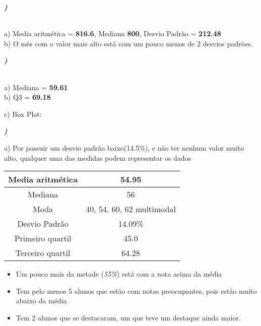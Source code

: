 \documentclass[12pt]{article}
\newcounter{instn}
\newcommand{\instnum}{\arabic{instn}}
\newcommand{\myline}[1]{
    \emph{\textbf{#1)}}
    \addtocounter{instn}{1}
}
\begin{document}
    \myline{\instnum} \\ a) Media aritmética = \textbf{816.6}, Mediana \textbf{800}, Desvio Padrão = \textbf{212.48}
    \\ b) O mês com o valor mais alto está com um pouco menos de 2 desvios padrões.


    \myline{\instnum} \\ a) Mediana = \textbf{59.61} \\ b) Q3 = \textbf{69.18}

    c) Box Plot: 
    \begin{center}
    \end{center}



    \myline{\instnum}

    a) Por possuir um desvio padrão baixo(14.5\%), e não ter nenhum valor muito alto,
    qualquer uma das medidas podem representar os dados

    \begin{center}
        \begin{tabular}{|c | c |} 
        \hline
        Media aritmética & 54.95 \\ 
        \hline
        Mediana & 56 \\ 
        \hline
        Moda & 40, 54, 60, 62 multimodal \\ 
        \hline
        Desvio Padrão & 14.09\% \\ 
        \hline
        Primeiro quartil & 45.0 \\ 
        \hline
        Terceiro quartil & 64.28 \\ 
        \hline
       \end{tabular}
    \end{center}

    \begin{itemize}
        \item Um pouco mais da metade (\emph{55\%}) está com a nota acima da média 
        \item Tem pelo menos 5 alunos que estão com notas preocupantes, pois estão muito abaixo da média 
        \item Tem 2 alunos que se destacaram, um que teve um destaque ainda maior.
    \end{itemize}
\end{document}
